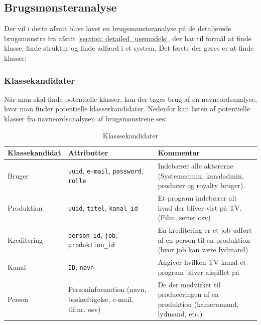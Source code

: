 \subsection{Brugsmønsteranalyse}
Der vil i dette afsnit blive lavet en brugsmønsteranalyse på de detaljerede brugsmønstre fra afsnit \ref{section: detailed_usemodels}, der har til formål at finde klasse, finde struktur og finde adfærd i et system. Det første der gøres er at finde klasser:

\subsubsection{Klassekandidater}
Når man skal finde potentielle klasser, kan der tages brug af en navneordsanalyse, hvor man finder potentielle klasserkandidater. Nedenfor kan listen af potentielle klasser fra navneordsanalysen af brugsmønstrene ses:

\begin{table}[ht]
    \begin{tabularx}{\textwidth}{|p{4cm}|p{4cm}|X|}
        \hline
        \textbf{Klassekandidat} & \textbf{Attributter} & \textbf{Kommentar} \\
        \hline
        Bruger      & \texttt{uuid}, \texttt{e-mail}, \texttt{password}, \texttt{rolle} & Indebærer alle aktørerne (Systemadmin, kanaladmin, producer og royalty bruger).\\
        \hline
        Produktion  & \texttt{uuid}, \texttt{titel}, \texttt{kanal\_id} & Et program indebærer alt hvad der bliver vist på TV. (Film, serier osv) \\
        \hline
        Kreditering & \texttt{person\_id}, \texttt{job}, \texttt{produktion\_id} & En kreditering er et job udført af en person til en produktion (hvor job kan være lydmand) \\
        \hline
        Kanal & \texttt{ID}, \texttt{navn} & Angiver hvilken TV-kanal et program bliver afspillet på \\
        \hline
        Person & Personinformation (navn, beskæftigelse, e-mail, tlf.nr. osv)  & De der medvirker til produceringen af en produktion (kameramand, lydmand, etc.)\\
        \hline
    \end{tabularx}
    \caption{Klasssekandidater}
    \label{table:class_candidates}
\end{table}


